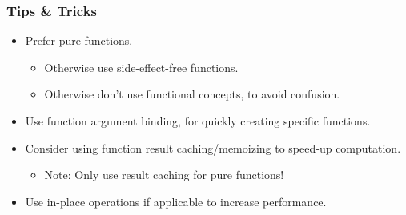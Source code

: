 \begin{frame}
	\frametitle{Tips \& Tricks}
	\begin{itemize}[<+-| highlight@+>]
		\item Prefer pure functions.
		\begin{itemize}[<+-| highlight@+>]
			\item Otherwise use side-effect-free functions.
			\item Otherwise don't use functional concepts, to avoid confusion.
		\end{itemize}
		\item Use function argument binding, for quickly creating specific functions.
		\item Consider using function result caching/memoizing to speed-up computation.
		\begin{itemize}[<+-| highlight@+>]
			\item Note: Only use result caching for \alert{pure} functions!
		\end{itemize}
		\item Use in-place operations if applicable to increase performance.
	\end{itemize}
\end{frame}


